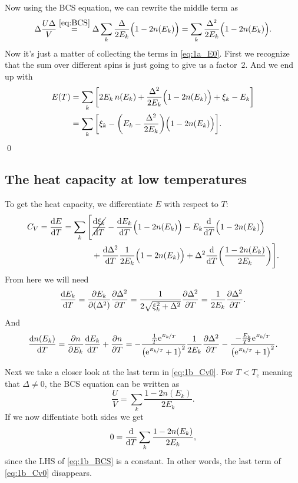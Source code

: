 \documentclass[11pt,letter, swedish, english
]{article}
\newcommand{\Tc}{\ensuremath{T_{\text{c}}}}
\begin{document}
Now using the BCS equation, we can rewrite the middle
term as
\begin{equation}
\Delta\frac{U\Delta}{V} \stackrel{\eqref{eq:BCS}}{=}
\Delta\sum_k \frac{\Delta}{2E_k}\Big(1-2n(E_k)\Big)
=\sum_k \frac{\Delta^2}{2E_k}\Big(1-2n(E_k)\Big).
\end{equation}
Now it's just a matter of collecting the terms in
\eqref{eq:1a_E0}. First we recognize that the sum over different spins
is just going to give us a factor~2. And we end up with
\begin{equation}
\begin{aligned}
E(T)&=\sum_k\qty[2E_k\,n(E_k)
+\frac{\Delta^2}{2E_k}\Big(1-2n(E_k)\Big)
+\xi_k-E_k ]\\
&=\sum_k\qty[
\xi_k-\qty(E_k-\frac{\Delta^2}{2E_k})\Big(1-2n(E_k)\Big) ].
\end{aligned}
\end{equation}
\qed

\subsection{The heat capacity at low temperatures}
To get the heat capacity, we differentiate $E$ with respect to $T$:
\begin{equation}\label{eq:1b_Cv0}
\begin{aligned}
C_V=\dv{E}{T}=\sum_k\Bigg[&
\cancel{\dv{\xi_k}{T}}-\dv{E_k}{T}\Big(1-2n(E_k)\Big)
-E_k\dv{T}\Big(1-2n(E_k)\Big)\\
&+\dv{\Delta^2}{T}\frac{1}{2E_k}\Big(1-2n(E_k)\Big) 
+\Delta^2 \dv{T}\qty(\frac{1-2n(E_k)}{2E_k})
\Bigg].
\end{aligned}
\end{equation}
From here we will need 
\begin{equation}\label{eq:1b_dEk/dT}
\dv{E_k}{T}=\pdv{E_k}{(\Delta^2)}\pdv{\Delta^2}{T}
=\frac{1}{2\sqrt{\xi_k^2+\Delta^2}}\pdv{\Delta^2}{T}
=\frac{1}{2E_k}\pdv{\Delta^2}{T}.
\end{equation}
And
\begin{equation}\label{eq:1b_dn/dT}
\dv{n(E_k)}{T}=\pdv{n}{E_k}\dv{E_k}{T}+\pdv{n}{T}
=-\frac{\frac{1}{T}\mathrm{e}^{\nicefrac{E_k}{T}}}
{\qty(\mathrm{e}^{\nicefrac{E_k}{T}}+1)^2}\frac{1}{2E_k}\pdv{\Delta^2}{T}
-\frac{-\frac{E_k}{T^2}\mathrm{e}^{\nicefrac{E_k}{T}}}
{\qty(\mathrm{e}^{\nicefrac{E_k}{T}}+1)^2}.
\end{equation}

Next we take a closer look at the last term in \eqref{eq:1b_Cv0}. For
$T<\Tc$ meaning that $\Delta\neq0$, the BCS equation can be written as
\begin{equation}\label{eq:1b_BCS}
\frac{U}{V}=\sum_k\frac{1-2n(E_k)}{2E_k}.
\end{equation}
If we now diffentiate both sides we get
\begin{equation}
0=\dv{T}\sum_k\frac{1-2n(E_k)}{2E_k},
\end{equation}
since the LHS of \eqref{eq:1b_BCS} is a constant. In other words, the
last term of \eqref{eq:1b_Cv0} disappears.
\end{document}
